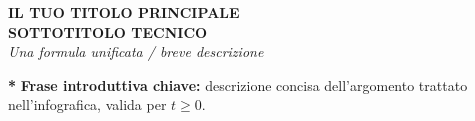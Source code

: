 \documentclass[a3paper, 12pt]{article}
\begin{document}
\begin{center}
  {\fontsize{28}{32}\selectfont\bfseries\color{accentGold}
    IL TUO TITOLO PRINCIPALE}\\[4pt]
  {\large\color{accentBlue}\bfseries SOTTOTITOLO TECNICO}\\[2pt]
  {\normalsize\color{textMuted}\itshape
    Una formula unificata / breve descrizione}
\end{center}

\vspace{0.3cm}

\begin{tcolorbox}[enhanced, colback=accentBlue!25!bgMid,
                  colframe=accentBlue, coltext=textLight,
                  arc=4pt, boxrule=0.8pt,
                  left=8pt, right=8pt, top=5pt, bottom=5pt]
  \textcolor{accentGold}{\textbf{*}}\quad
  \textbf{Frase introduttiva chiave:} descrizione concisa
  dell'argomento trattato nell'infografica, valida per $ t \ge 0 $.
\end{tcolorbox}

\vspace{0.4cm}
\end{document}
